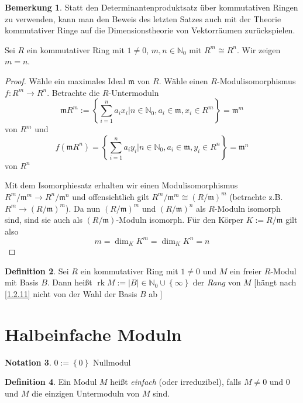 \documentclass[
twoside=semi,
fontsize=12,
DIV=12, 
cleardoublepage=current,
leqno,
headings=optiontoheadandtoc, 
toc=idx
]{scrbook}
\newcommand{\N}{\mathbb{N}}
\newcommand{\set}[1]{\left\{ #1 \right\}}
\DeclareMathOperator{\rk}{rk}
\theoremstyle{definition}
\newtheorem{definition}{Definition}[section]
\newtheorem{bemerkung}[definition]{Bemerkung}
\newtheorem{notation}[definition]{Notation}
\begin{document}
	\begin{bemerkung}\label{1.2.12}
		Statt den Determinantenproduktsatz \"uber kommutativen Ringen zu verwenden, kann man den Beweis des letzten Satzes auch mit der Theorie kommutativer Ringe auf die Dimensionstheorie von Vektorr\"aumen zur\"uckspielen. 
		
		\noindent Sei $R$ ein kommutativer Ring mit $1 \neq 0$, $m, n\in \N_0$ mit $R^m \cong R^n$. Wir zeigen $m = n$.
		
		\begin{proof}
			W\"ahle ein maximales Ideal $\mathfrak{m}$ von $R$. W\"ahle einen $R$-Modulisomorphismus $f:R^m \to R^n$. Betrachte die $R$-Untermoduln
			\[\mathfrak{m}R^m := \set{\sum_{i=1}^n a_ix_i|n \in \N_0, a_i \in \mathfrak{m}, x_i \in R^m} = \mathfrak{m}^m\]
			von $R^m$ und 
			\[f(\mathfrak{m}R^n) = \set{\sum_{i=1}^n a_iy_i|n \in \N_0, a_i \in \mathfrak{m}, y_i \in R^n} = \mathfrak{m}^n\]
			von $R^n$
			
			\noindent Mit dem Isomorphiesatz erhalten wir einen Modulisomorphismus $R^m/\mathfrak{m}^m \to R^n/\mathfrak{m}^n$ und offensichtlich gilt $R^m/\mathfrak{m}^m  \cong (R/\mathfrak{m})^m$ (betrachte z.B. $R^m \to (R/\mathfrak{m})^m$).\newline
			Da nun $(R/\mathfrak{m})^m$ und $(R/\mathfrak{m})^n$ als $R$-Moduln isomorph sind, sind sie auch als $(R/\mathfrak{m})$-Moduln isomorph. F\"ur den K\"orper $K:= R/\mathfrak{m}$ gilt also 
			\[m = \dim_K K^m = \dim_K K^n = n\]
		\end{proof}
	\end{bemerkung}

	\begin{definition}\label{1.2.13}
		Sei $R$ ein kommutativer Ring mit $1 \neq 0$ und $M$ ein freier $R$-Modul mit Basis $B$. Dann hei\ss t $\rk M := |B| \in \N_0 \cup \set{\infty}$ der \emph{Rang} von $M$ [h\"angt nach \ref{1.2.11} nicht von der Wahl der Basis $B$ ab ]
	\end{definition}
	\newpage
	
	\section{Halbeinfache Moduln}
	\begin{notation}\label{1.3.1}
		$0 := \set{0}$ Nullmodul
	\end{notation}
	
	\begin{definition}\label{1.3.2}
		Ein Modul $M$ hei\ss t \emph{einfach} (oder irreduzibel), falls $M \neq 0$ und $0$ und $M$ die einzigen Untermoduln von $M$ sind.
	\end{definition}
	
\end{document}
